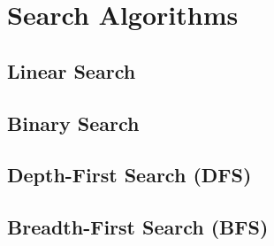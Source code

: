 \documentclass[11pt]{article}
\begin{document}
\section{Search Algorithms}


        \subsection{Linear Search}
        \subsection{Binary Search}
        \subsection{Depth-First Search (DFS)}
        \subsection{Breadth-First Search (BFS)}


        \subsection{}
        \subsection{}
        \subsection{}
        \subsection{}
        \subsection{}
        \subsection{}
        \subsection{}
        \subsection{}
\end{document}
